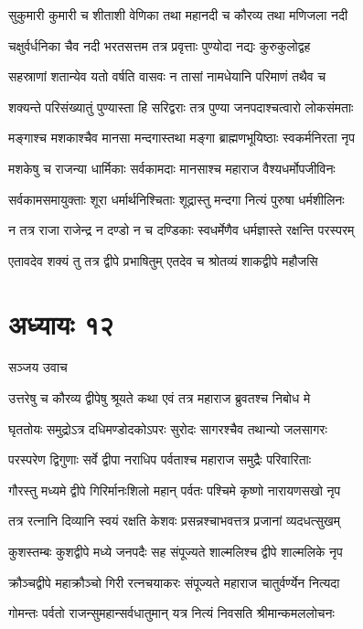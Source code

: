 \twolineshloka
{सुकुमारी कुमारी च शीताशी वेणिका तथा}
{महानदी च कौरव्य तथा मणिजला नदी}


\twolineshloka
{चक्षुर्वर्धनिका चैव नदी भरतसत्तम}
{तत्र प्रवृत्ताः पुण्योदा नद्यः कुरुकुलोद्वह}


\twolineshloka
{सहस्राणां शतान्येव यतो वर्षति वासवः}
{न तासां नामधेयानि परिमाणं तथैव च}


\twolineshloka
{शक्यन्ते परिसंख्यातुं पुण्यास्ता हि सरिद्वराः}
{तत्र पुण्या जनपदाश्चत्वारो लोकसंमताः}


\twolineshloka
{मङ्गाश्च मशकाश्चैव मानसा मन्दगास्तथा}
{मङ्गा ब्राह्मणभूयिष्ठाः स्वकर्मनिरता नृप}


\twolineshloka
{मशकेषु च राजन्या धार्मिकाः सर्वकामदाः}
{मानसाश्च महाराज वैश्यधर्मोपजीविनः}


\twolineshloka
{सर्वकामसमायुक्ताः शूरा धर्मार्थनिश्चिताः}
{शूद्रास्तु मन्दगा नित्यं पुरुषा धर्मशीलिनः}


\twolineshloka
{न तत्र राजा राजेन्द्र न दण्डो न च दण्डिकाः}
{स्वधर्मेणैव धर्मज्ञास्ते रक्षन्ति परस्परम्}


\twolineshloka
{एतावदेव शक्यं तु तत्र द्वीपे प्रभाषितुम्}
{एतदेव च श्रोतव्यं शाकद्वीपे महौजसि}


\chapter{अध्यायः १२}
\twolineshloka
{सञ्जय उवाच}
{}


\twolineshloka
{उत्तरेषु च कौरव्य द्वीपेषु श्रूयते कथा}
{एवं तत्र महाराज ब्रुवतश्च निबोध मे}


\twolineshloka
{घृततोयः समुद्रोऽत्र दधिमण्डोदकोऽपरः}
{सुरोदः सागरश्चैव तथान्यो जलसागरः}


\twolineshloka
{परस्परेण द्विगुणाः सर्वे द्वीपा नराधिप}
{पर्वताश्च महाराज समुद्रैः परिवारिताः}


\twolineshloka
{गौरस्तु मध्यमे द्वीपे गिरिर्मानःशिलो महान्}
{पर्वतः पश्चिमे कृष्णो नारायणसखो नृप}


\twolineshloka
{तत्र रत्नानि दिव्यानि स्वयं रक्षति केशवः}
{प्रसन्नश्चाभवत्तत्र प्रजानां व्यदधत्सुखम्}


\twolineshloka
{कुशस्तम्बः कुशद्वीपे मध्ये जनपदैः सह}
{संपूज्यते शाल्मलिश्च द्वीपे शाल्मलिके नृप}


\twolineshloka
{क्रौञ्चद्वीपे महाक्रौञ्चो गिरी रत्नचयाकरः}
{संपूज्यते महाराज चातुर्वर्ण्येन नित्यदा}


\twolineshloka
{गोमन्तः पर्वतो राजन्सुमहान्सर्वधातुमान्}
{यत्र नित्यं निवसति श्रीमान्कमललोचनः}


